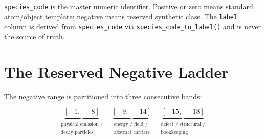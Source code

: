 \documentclass[11pt,a4paper]{article}
\begin{document}
\texttt{species\_code} is the master numeric identifier.
Positive or zero means standard atom/object template;
negative means reserved synthetic class.
The \texttt{label} column is derived from \texttt{species\_code}
via \texttt{species\_code\_to\_label()} and is never the source of truth.

\section{The Reserved Negative Ladder}

The negative range is partitioned into three consecutive bands:

\[
\underbrace{[-1,\ -8]}_{\substack{\text{physical emission /}\\\text{decay particles}}}
\quad
\underbrace{[-9,\ -14]}_{\substack{\text{energy / field /}\\\text{abstract carriers}}}
\quad
\underbrace{[-15,\ -18]}_{\substack{\text{defect / structural /}\\\text{bookkeeping}}}
\]
\end{document}
